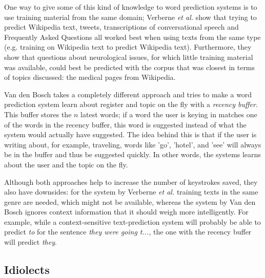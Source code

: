 \documentclass[11pt]{article}
\begin{document}
One way to give some of this kind of knowledge to word prediction systems is to use training material from the same domain; Verberne {\em et al.}  show that trying to predict Wikipedia text, tweets, transcriptions of conversational speech and Frequently Asked Questions all worked best when using texts from the same type (e.g. training on Wikipedia text to predict Wikipedia text). Furthermore, they show that questions about neurological issues, for which little training material was available, could best be predicted with the corpus that was closest in terms of topics discussed: the medical pages from Wikipedia. 

Van den Bosch  takes a completely different approach and tries to make a word prediction system learn about register and topic on the fly with a \emph{recency buffer}. This buffer stores the $n$ latest words; if a word the user is keying in matches one of the words in the recency buffer, this word is suggested instead of what the system would actually have suggested. The idea behind this is that if the user is writing about, for example, traveling, words like 'go', 'hotel', and 'see' will always be in the buffer and thus be suggested quickly. In other words, the systems learns about the user and the topic on the fly.

Although both approaches help to increase the number of keystrokes saved, they also have downsides: for the system by Verberne {\em et al.}  training texts in the same genre are needed, which might not be available, whereas the system by Van den Bosch  ignores context information that it should weigh more intelligently. For example, while a context-sensitive text-prediction system will probably be able to predict \emph{to} for the sentence \emph{they were going t...}, the one with the recency buffer will predict \emph{they}.


\subsection{Idiolects} \label{idiolects}
\end{document}
